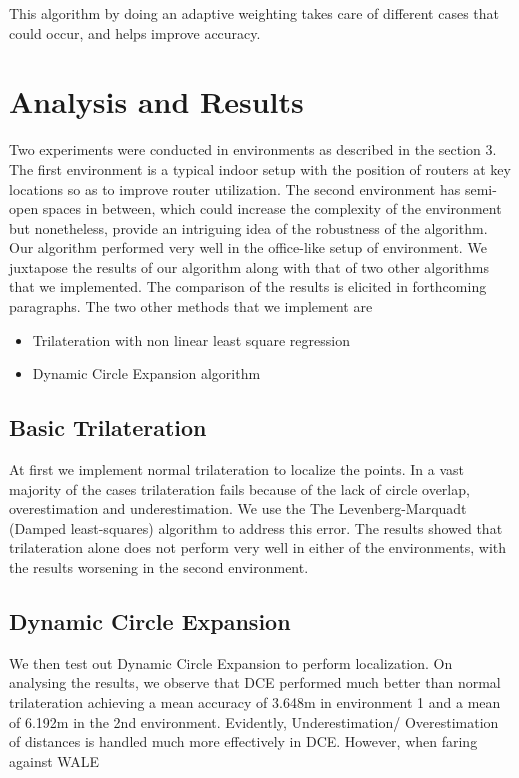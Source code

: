 \documentclass[twocolumn, 11pt]{IEEEtran}
\begin{document}
This algorithm by doing an adaptive weighting takes care of different cases that could occur, and helps improve accuracy. 

\section{Analysis and Results}

Two experiments were conducted in environments as described in the section 3.  
The first environment is a typical indoor setup with the position of routers at key locations so as to improve router utilization. 
The second environment has semi-open spaces in between, which could increase the complexity of the environment but nonetheless, provide an intriguing idea of the robustness of the algorithm. 
Our algorithm performed very well in the office-like setup of environment.
We juxtapose the results of our algorithm along with that of two other algorithms that we implemented. The comparison of the results is elicited in forthcoming paragraphs. 
The two other methods that we implement are
\begin{itemize}
    \item Trilateration with non linear least square regression
    \item Dynamic Circle Expansion algorithm 
\end{itemize}

\subsection{Basic Trilateration} 
At first we implement normal trilateration to localize the points. In a vast majority of the cases trilateration fails because of the lack of circle overlap, overestimation and underestimation.  We use the The Levenberg-Marquadt (Damped least-squares) algorithm \cite{marquardt1963algorithm} to address this error. The results showed that trilateration alone does not perform very well in either of the environments, with the results worsening in the second environment.

\subsection{Dynamic Circle Expansion}
We then test out Dynamic Circle Expansion \cite{DCE} to perform localization. On analysing the results, we observe that DCE performed much better than normal trilateration achieving a mean accuracy of 3.648m in environment 1 and a mean of 6.192m in the 2nd environment. Evidently, Underestimation/ Overestimation of distances is handled much more effectively in DCE. However, when faring against WALE
\end{document}
